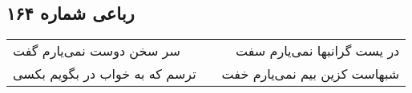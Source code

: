 \begin{center}
\section*{رباعی شماره ۱۶۴}
\label{sec:sh164}
\begin{longtable}{l p{0.5cm} r}
سر سخن دوست نمی‌یارم گفت
&&
در یست گرانبها نمی‌یارم سفت
\\
ترسم که به خواب در بگویم بکسی
&&
شبهاست کزین بیم نمی‌یارم خفت
\\
\end{longtable}
\end{center}

